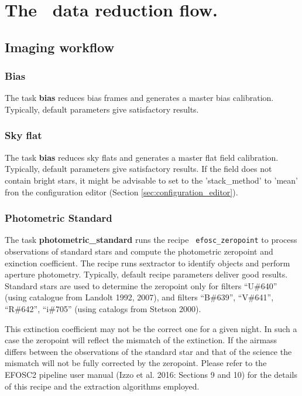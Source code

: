 \section{The \instname\ data reduction flow.}
\label{sec:reduction_flow}


\subsection{Imaging workflow}
\subsubsection{Bias}

The task {\bf bias} reduces bias frames and generates a master bias
calibration. Typically, default parameters give satisfactory results.


\subsubsection{Sky flat}
The task {\bf bias} reduces sky flats and generates a master flat
field calibration. Typically, default parameters give satisfactory
results.  If the field does not contain bright stars, it might be
advisable to set to the 'stack\_method' to 'mean' fron the
configuration editor (Section \ref{sec:configuration_editor}).

\subsubsection{Photometric Standard}

The task {\bf photometric\_standard} runs the recipe {\tt
  efosc\_zeropoint} to process observations of standard stars and
compute the photometric zeropoint and exinction coefficient. The
recipe runs sextractor to identify objects and perform aperture
photometry. Typically, default recipe parameters deliver good
results. Standard stars are used to determine the zeropoint only for
filters “U\#640” (using catalogue from Landolt 1992, 2007), and filters
“B\#639”, “V\#641”, “R\#642”, “i\#705” (using catalogs from Stetson 2000).

This extinction coefficient may not be the correct one for a given
night. In such a case the zeropoint will reflect the mismatch of the
extinction. If the airmass differs between the observations of the
standard star and that of the science the mismatch will not be fully
corrected by the zeropoint. Please refer to the EFOSC2 pipeline user
manual (Izzo et al. 2016: Sections 9 and 10) for the details of this
recipe and the extraction algorithms employed.

